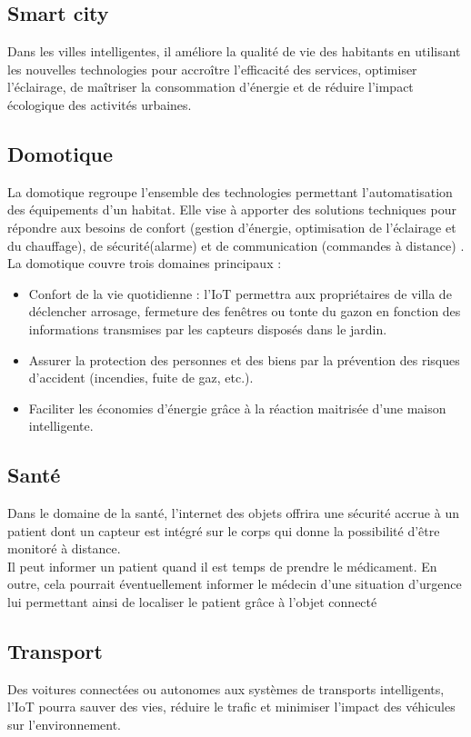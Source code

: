 		\subsection*{ Smart city }
Dans les villes intelligentes, il améliore la qualité de vie des habitants en utilisant les nouvelles technologies pour accroître l’ef{\kern0pt}f{\kern0pt}icacité des services, optimiser l’éclairage, de maîtriser la consommation d’énergie et de réduire l’impact écologique des activités urbaines.
		\subsection*{Domotique }
		La domotique regroupe l’ensemble des technologies permettant l’automatisation des équipements d’un habitat. Elle vise à apporter des solutions techniques pour répondre aux besoins de confort (gestion d’énergie, optimisation de l’éclairage et du chauf{\kern0pt}fage), de sécurité(alarme) et de communication (commandes à distance) \cite{locqueneux2015domotique}.\\
		La domotique couvre trois domaines principaux :
		\begin{itemize}
			\item Confort de la vie quotidienne : l’IoT permettra aux propriétaires de villa de déclencher arrosage, fermeture des fenêtres ou tonte du gazon en fonction des informations transmises par les capteurs disposés dans le jardin.
			\item Assurer la protection des personnes et des biens par la prévention des risques d’accident (incendies, fuite de gaz, etc.).
			\item Faciliter les économies d’énergie grâce à la réaction maitrisée d’une maison intelligente.
		\end{itemize}
		\subsection*{Santé }
		Dans le domaine de la santé, l’internet des objets of{\kern0pt}frira une sécurité accrue à un patient dont un capteur est intégré sur le corps qui donne la possibilité d’être monitoré à distance.\\
Il peut informer un patient quand il est temps de prendre le médicament. En outre, cela pourrait éventuellement informer le médecin d’une situation d’urgence lui permettant ainsi de localiser le patient grâce à l’objet connecté
\subsection*{Transport }
		Des voitures connectées ou autonomes aux systèmes de transports intelligents, l’IoT pourra sauver des vies, réduire le traf{\kern0pt}ic et minimiser l’impact des véhicules sur l’environnement.
		
